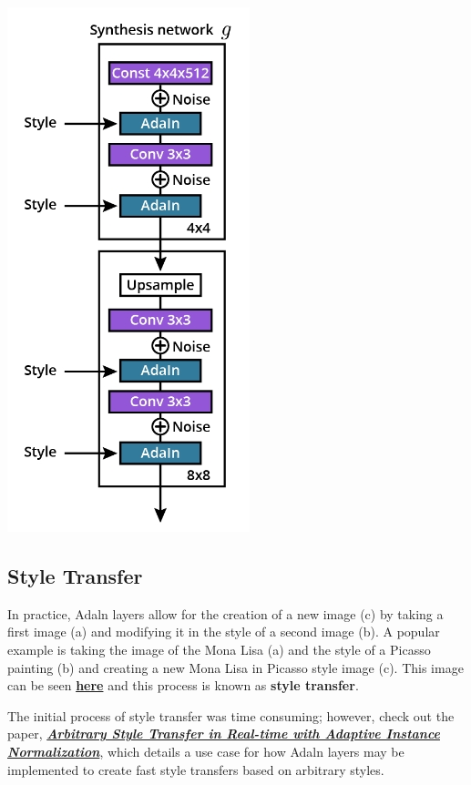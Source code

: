 \includegraphics[width=0.5\linewidth]{img//genAdvNet//modernGAN/screen-shot-2022-06-30-at-6.26.28-pm.jpeg}


\subsection{Style Transfer}
In practice, Adaln layers allow for the creation of a new image (c) by taking a first image (a) and modifying it in the style of a second image (b). A popular example is taking the image of the Mona Lisa (a) and the style of a Picasso painting (b) and creating a new Mona Lisa in Picasso style image (c). This image can be seen \href{https://www.deviantart.com/dr-koesters/art/Neural-Style-Transfer-Mona-Lisa-by-Picasso-733533838}{\textbf{here}} and this process is known as \textbf{style transfer}. \newline

The initial process of style transfer was time consuming; however, check out the paper, \href{https://arxiv.org/pdf/1703.06868.pdf}{\textbf{\textit{Arbitrary Style Transfer in Real-time with Adaptive Instance Normalization}}}, which details a use case for how Adaln layers may be implemented to create fast style transfers based on arbitrary styles.

